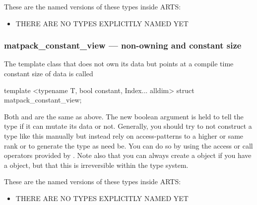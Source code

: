 These are the named versions of these types inside ARTS:
\begin{itemize}
\item THERE ARE NO TYPES EXPLICITLY NAMED YET
\end{itemize}

\subsubsection{matpack\_constant\_view --- non-owning and constant size}
The template class that does not own its data but points at a compile time constant size of data
is called
\begin{code}
template <typename T, bool constant, Index... alldim>
struct matpack_constant_view;
\end{code}
Both  and  are the same as above.  The new boolean argument 
is held to tell the type if it can mutate its data or not.  Generally, you should try to not construct
a type like this manually but instead rely on access-patterns to a higher or same rank  or 
to generate the type as need be.  You can do so by using the access or call operators provided by 
.  Note also that you can always create a 
object if you have a  object, but that this is irreversible within the type
system.

These are the named versions of these types inside ARTS:
\begin{itemize}
\item THERE ARE NO TYPES EXPLICITLY NAMED YET
\end{itemize}

